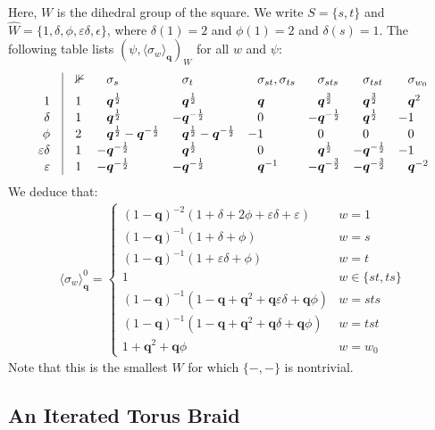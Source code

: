 \documentclass[a4paper,10pt,leqno]{amsart}
\theoremstyle{plain}
\theoremstyle{plain}
\theoremstyle{plain}
\theoremstyle{definition}
\theoremstyle{remark}
\newcommand{\Q}{\bm{q}}
\newcommand{\Tr}[1]{\langle{#1}\rangle_{\Q}}
\begin{document}
Here, $W$ is the dihedral group of the square.
We write $S = \{s, t\}$ and $\hat{W} = \{1, \delta, \phi, \varepsilon\delta, \epsilon\}$, where $\delta(1) = 2$ and $\phi(1) = 2$ and $\delta(s) = 1$.
The following table lists $(\psi, \Tr{\sigma_w})_W$ for all $w$ and $\psi$:
\begin{align}
\begin{array}{r@{\quad}|@{\quad}l@{}ll@{}ll@{}ll@{}ll@{}ll@{}ll@{}l}
	&&\bb{1}
	&&\sigma_s
	&&\sigma_t
	&&\sigma_{st}, \sigma_{ts}
	&&\sigma_{sts}
	&&\sigma_{tst}
	&&\sigma_{w_0}\\[1ex]
1
	&&1
	&&\Q^{\frac{1}{2}}
	&&\Q^{\frac{1}{2}}
	&&\Q
	&&\Q^{\frac{3}{2}}
	&&\Q^{\frac{3}{2}}
	&&\Q^2\\
\delta
	&&1
	&&\Q^{\frac{1}{2}}
	&-&\Q^{-\frac{1}{2}}
	&&0
	&-&\Q^{-\frac{1}{2}}
	&&\Q^{\frac{1}{2}}
	&-&1\\
\phi
	&&2
	&&\Q^{\frac{1}{2}} - \Q^{-\frac{1}{2}}
	&&\Q^{\frac{1}{2}} - \Q^{-\frac{1}{2}}
	&-&1
	&&0
	&&0
	&&0\\
\varepsilon\delta
	&&1
	&-&\Q^{-\frac{1}{2}}
	&&\Q^{\frac{1}{2}}
	&&0
	&&\Q^{\frac{1}{2}}
	&-&\Q^{-\frac{1}{2}}
	&-&1\\
\varepsilon
	&&1
	&-&\Q^{-\frac{1}{2}}
	&-&\Q^{-\frac{1}{2}}
	&&\Q^{-1}
	&-&\Q^{-\frac{3}{2}}
	&-&\Q^{-\frac{3}{2}}
	&&\Q^{-2}
\end{array}
\end{align}
We deduce that:
\begin{align}
\Tr{\sigma_w}^0
=	\left\{\begin{array}{ll}
(1 - \Q)^{-2}(1 + \delta + 2\phi + \varepsilon\delta + \varepsilon)
	&w = 1\\
(1 - \Q)^{-1}(1 + \delta + \phi)
	&w = s\\
(1 - \Q)^{-1}(1 + \varepsilon\delta + \phi)
	&w = t\\
1
	&w \in \{st, ts\}\\
(1 - \Q)^{-1}
	(1 - \Q + \Q^2 + \Q\varepsilon\delta + \Q\phi)
	&w = sts\\
(1 - \Q)^{-1}	
	(1 - \Q + \Q^2 + \Q\delta + \Q\phi)
	&w = tst\\
1 + \Q^2 + \Q\phi
	&w = w_0
\end{array}\right.
\end{align}
Note that this is the smallest $W$ for which $\{-, -\}$ is nontrivial.

\subsection*{An Iterated Torus Braid}
\end{document}
